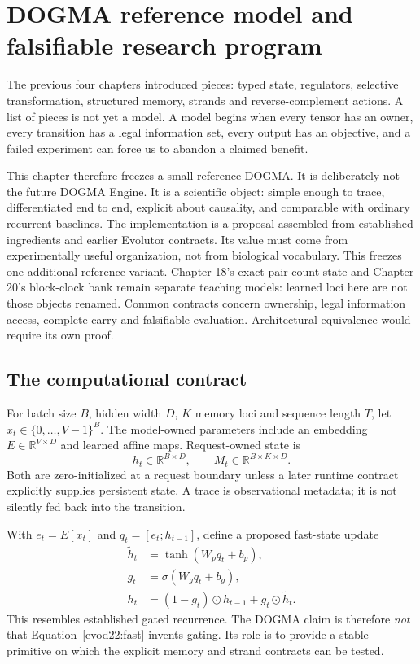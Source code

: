 \chapter{DOGMA reference model and falsifiable research program}

The previous four chapters introduced pieces: typed state, regulators, selective
transformation, structured memory, strands and reverse-complement actions. A list of
pieces is not yet a model. A model begins when every tensor has an owner, every
transition has a legal information set, every output has an objective, and a failed
experiment can force us to abandon a claimed benefit.

This chapter therefore freezes a small reference DOGMA. It is deliberately not the
future DOGMA Engine. It is a scientific object: simple enough to trace, differentiated
end to end, explicit about causality, and comparable with ordinary recurrent
baselines. The implementation is a proposal assembled from established ingredients
and earlier Evolutor contracts. Its value must come from experimentally useful
organization, not from biological vocabulary.
This freezes one additional reference variant. Chapter 18's exact pair-count
state and Chapter 20's block-clock bank remain separate teaching models:
learned loci here are not those objects renamed. Common contracts concern
ownership, legal information access, complete carry and falsifiable evaluation.
Architectural equivalence would require its own proof.

\section{The computational contract}

For batch size $B$, hidden width $D$, $K$ memory loci and sequence length $T$, let
$x_t\in\{0,\ldots,V-1\}^B$. The model-owned parameters include an embedding
$E\in\mathbb R^{V\times D}$ and learned affine maps. Request-owned state is
\[
h_t\in\mathbb R^{B\times D},\qquad
M_t\in\mathbb R^{B\times K\times D}.
\]
Both are zero-initialized at a request boundary unless a later runtime contract
explicitly supplies persistent state. A trace is observational metadata; it is not
silently fed back into the transition.


With $e_t=E[x_t]$ and $q_t=[e_t;h_{t-1}]$, define a proposed fast-state update
\begin{align}
\tilde h_t &= \tanh(W_pq_t+b_p),\\
g_t &= \sigma(W_gq_t+b_g),\\
h_t &= (1-g_t)\odot h_{t-1}+g_t\odot\tilde h_t.
\label{evod22:fast}
\end{align}
This resembles established gated recurrence. The DOGMA claim is therefore
\emph{not} that Equation~\ref{evod22:fast} invents gating. Its role is to provide
a stable primitive on which the explicit memory and strand contracts can be tested.

